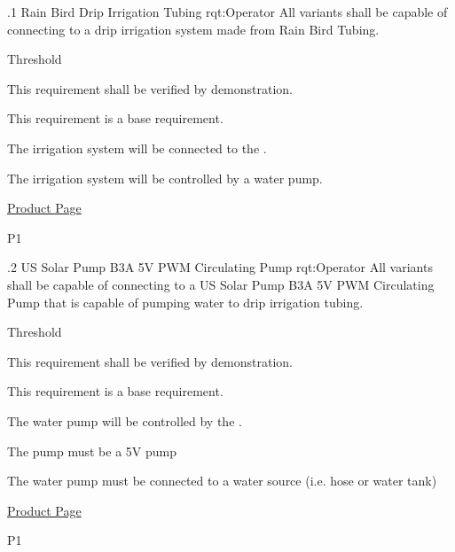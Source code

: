 \ONERQMTVKPP
{\RqtNumberBase.1}
{Rain Bird Drip Irrigation Tubing}
{rqt:Operator}
{All \ThisSys variants shall be capable of connecting to a drip irrigation system made from Rain Bird Tubing.}
{
	\item [All Phases] Threshold
}
{This requirement shall be verified by demonstration.}
{
	\item [N/A] This requirement is a base requirement.
}
{
  \item The irrigation system will be connected to the \ThisSystem.
  \item The irrigation system will be controlled by a water pump.
  \item \href{https://www.homedepot.com/p/Rain-Bird-1-2-in-0-71-in-O-D-x-100-ft-Distribution-Tubing-for-Drip-Irrigation-T70-100S/204751445}{Product Page}
}
{P1}

\ONERQMTVKPP
{\RqtNumberBase.2}
{US Solar Pump B3A 5V PWM Circulating Pump}
{rqt:Operator}
{All \ThisSys variants shall be capable of connecting to a US Solar Pump B3A 5V PWM Circulating Pump that is capable of pumping water to drip irrigation tubing.}
{
	\item [All Phases] Threshold
}
{This requirement shall be verified by demonstration.}
{
	\item [N/A] This requirement is a base requirement.
}
{
  \item The water pump will be controlled by the \ThisSystem. 
  \item The pump must be a 5V pump
  \item The water pump must be connected to a water source (i.e. hose or water tank)
  \item \href{https://www.ussolarpumps.com/catalog/5v-pwm-wired-pumps/b3a-5v-pwm-circulating-pump/}{Product Page}
}
{P1}

